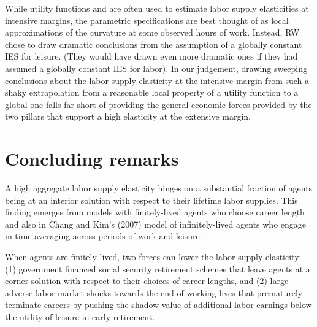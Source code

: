 While utility functions  and  are often
used to estimate labor supply elasticities at intensive margins,
the parametric specifications are best thought of as local
approximations of the curvature at some
observed hours of work. Instead, RW  chose to draw dramatic conclusions from
the assumption of a globally constant IES for
leisure. (They would have drawn even more dramatic ones if  they had assumed a globally
constant IES for labor).
In our judgement, drawing sweeping conclusions about the labor supply elasticity at the intensive margin
from such a shaky extrapolation from a reasonable local  property of a utility function to a global one falls
far short of providing the general economic forces provided by the two  pillars that support a high elasticity at the
extensive margin.










\section{Concluding remarks}

A high aggregate labor supply elasticity hinges on a substantial
fraction of agents being at an interior solution with respect to their lifetime labor supplies.
This finding emerges  from models with
finitely-lived agents who choose career length and also
in Chang and Kim's (2007) model of infinitely-lived agents
who engage in time averaging across periods of work and leisure.

 When agents are finitely lived, two forces  can lower the labor supply
elasticity: (1) government financed
social security retirement schemes that leave agents at a corner
solution with respect to their choices of career lengths,  and (2)  large adverse
labor market shocks towards the end of working lives that
prematurely terminate careers by pushing  the shadow value of additional labor earnings  below the utility
of leisure in early retirement.


